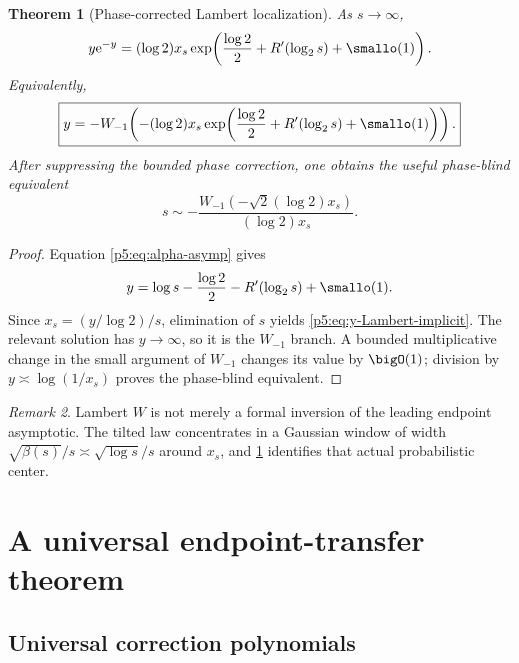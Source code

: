 \documentclass[11pt]{article}
\numberwithin{equation}{section}
\newtheorem{theorem}{Theorem}[section]
\theoremstyle{definition}
\theoremstyle{remark}
\newtheorem{remark}[theorem]{Remark}
\newcommand{\e}{\mathrm e}
\begin{document}
\begin{theorem}[Phase-corrected Lambert localization]\label{p5:thm:Lambert-localization}
As $s\to\infty$,
\begin{equation}\label{p5:eq:y-Lambert-implicit}
 y\e^{-y}=(\log2)x_s
 \exp\!\left(\frac{\log2}{2}+R'(\log_2s)+\smallo(1)\right).
\end{equation}
Equivalently,
\begin{equation}\label{p5:eq:y-W}
 \boxed{
 y=-W_{-1}\!\left(-(
 \log2)x_s\exp\!\left(\frac{\log2}{2}+R'(\log_2s)+\smallo(1)\right)
 \right).}
\end{equation}
After suppressing the bounded phase correction, one obtains the useful
phase-blind equivalent
\begin{equation}\label{p5:eq:s-W-leading}
 s\sim
 -\frac{W_{-1}(-\sqrt2(\log2)x_s)}{(\log2)x_s}.
\end{equation}
\end{theorem}

\begin{proof}
Equation \cref{p5:eq:alpha-asymp} gives
\[
 y=\log s-\frac{\log2}{2}-R'(\log_2s)+\smallo(1).
\]
Since $x_s=(y/\log2)/s$, elimination of $s$ yields
\cref{p5:eq:y-Lambert-implicit}.  The relevant solution has $y\to\infty$, so it
is the $W_{-1}$ branch.  A bounded multiplicative change in the small argument
of $W_{-1}$ changes its value by $\bigO(1)$; division by
$y\asymp\log(1/x_s)$ proves the phase-blind equivalent.
\end{proof}

\begin{remark}
Lambert $W$ is not merely a formal inversion of the leading endpoint
asymptotic.  The tilted law concentrates in a Gaussian window of width
$\sqrt{\beta(s)}/s\asymp\sqrt{\log s}/s$ around $x_s$, and
\cref{p5:thm:Lambert-localization} identifies that actual probabilistic center.
\end{remark}

\section{A universal endpoint-transfer theorem}

\subsection{Universal correction polynomials}
\end{document}
